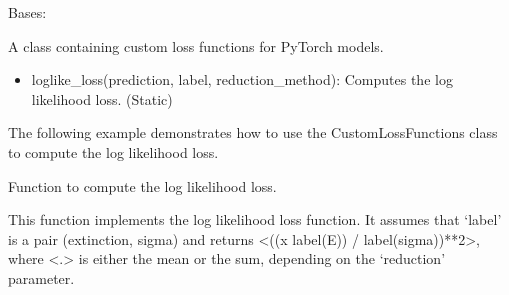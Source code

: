 \documentclass[letterpaper,10pt,english]{sphinxmanual}
\begin{document}
\begin{fulllineitems}
\label{\detokenize{CustomLossFunctions:CustomLossFunctions.CustomLossFunctions}}
\pysigstartsignatures
{}
\pysigstopsignatures
\sphinxAtStartPar
Bases: 

\sphinxAtStartPar
A class containing custom loss functions for PyTorch models.
\begin{description}
\begin{itemize}
\item {} 
\sphinxAtStartPar
loglike\_loss(prediction, label, reduction\_method): Computes the log likelihood loss. (Static)

\end{itemize}

\sphinxAtStartPar
The following example demonstrates how to use the CustomLossFunctions class to compute the log likelihood loss.

\begin{sphinxVerbatim}[commandchars=\\\{\}]
    
\end{sphinxVerbatim}

\end{description}

\begin{fulllineitems}
\label{\detokenize{CustomLossFunctions:CustomLossFunctions.CustomLossFunctions.loglike_loss}}
\pysigstartsignatures
{}
\pysigstopsignatures
\sphinxAtStartPar
Function to compute the log likelihood loss.
\begin{description}
\sphinxAtStartPar
This function implements the log likelihood loss function. It assumes that ‘label’ is a pair (extinction,
sigma) and returns \textless{}((x \sphinxhyphen{} label(E)) / label(sigma))**2\textgreater{}, where \textless{}.\textgreater{} is either the mean or the sum,
depending on the ‘reduction’ parameter.


\end{description}
\end{fulllineitems}
\end{fulllineitems}
\end{document}
